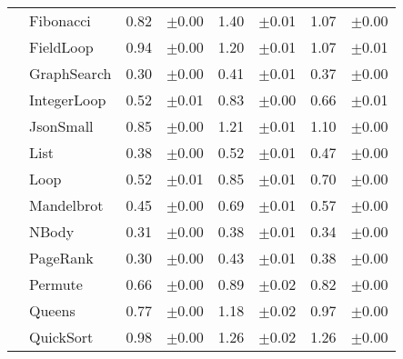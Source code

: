 \begin{tabular}{llrlrlrl}
 & Fibonacci & 0.82 & \scriptsize\textcolor{gray!60}{$\pm$0.00} & 1.40 & \scriptsize\textcolor{gray!60}{$\pm$0.01} & 1.07 & \scriptsize\textcolor{gray!60}{$\pm$0.00} \\
 & FieldLoop & 0.94 & \scriptsize\textcolor{gray!60}{$\pm$0.00} & 1.20 & \scriptsize\textcolor{gray!60}{$\pm$0.01} & 1.07 & \scriptsize\textcolor{gray!60}{$\pm$0.01} \\
 & GraphSearch & 0.30 & \scriptsize\textcolor{gray!60}{$\pm$0.00} & 0.41 & \scriptsize\textcolor{gray!60}{$\pm$0.01} & 0.37 & \scriptsize\textcolor{gray!60}{$\pm$0.00} \\
 & IntegerLoop & 0.52 & \scriptsize\textcolor{gray!60}{$\pm$0.01} & 0.83 & \scriptsize\textcolor{gray!60}{$\pm$0.00} & 0.66 & \scriptsize\textcolor{gray!60}{$\pm$0.01} \\
 & JsonSmall & 0.85 & \scriptsize\textcolor{gray!60}{$\pm$0.00} & 1.21 & \scriptsize\textcolor{gray!60}{$\pm$0.01} & 1.10 & \scriptsize\textcolor{gray!60}{$\pm$0.00} \\
 & List & 0.38 & \scriptsize\textcolor{gray!60}{$\pm$0.00} & 0.52 & \scriptsize\textcolor{gray!60}{$\pm$0.01} & 0.47 & \scriptsize\textcolor{gray!60}{$\pm$0.00} \\
 & Loop & 0.52 & \scriptsize\textcolor{gray!60}{$\pm$0.01} & 0.85 & \scriptsize\textcolor{gray!60}{$\pm$0.01} & 0.70 & \scriptsize\textcolor{gray!60}{$\pm$0.00} \\
 & Mandelbrot & 0.45 & \scriptsize\textcolor{gray!60}{$\pm$0.00} & 0.69 & \scriptsize\textcolor{gray!60}{$\pm$0.01} & 0.57 & \scriptsize\textcolor{gray!60}{$\pm$0.00} \\
 & NBody & 0.31 & \scriptsize\textcolor{gray!60}{$\pm$0.00} & 0.38 & \scriptsize\textcolor{gray!60}{$\pm$0.01} & 0.34 & \scriptsize\textcolor{gray!60}{$\pm$0.00} \\
 & PageRank & 0.30 & \scriptsize\textcolor{gray!60}{$\pm$0.00} & 0.43 & \scriptsize\textcolor{gray!60}{$\pm$0.01} & 0.38 & \scriptsize\textcolor{gray!60}{$\pm$0.00} \\
 & Permute & 0.66 & \scriptsize\textcolor{gray!60}{$\pm$0.00} & 0.89 & \scriptsize\textcolor{gray!60}{$\pm$0.02} & 0.82 & \scriptsize\textcolor{gray!60}{$\pm$0.00} \\
 & Queens & 0.77 & \scriptsize\textcolor{gray!60}{$\pm$0.00} & 1.18 & \scriptsize\textcolor{gray!60}{$\pm$0.02} & 0.97 & \scriptsize\textcolor{gray!60}{$\pm$0.00} \\
 & QuickSort & 0.98 & \scriptsize\textcolor{gray!60}{$\pm$0.00} & 1.26 & \scriptsize\textcolor{gray!60}{$\pm$0.02} & 1.26 & \scriptsize\textcolor{gray!60}{$\pm$0.00} \\

\end{tabular}

